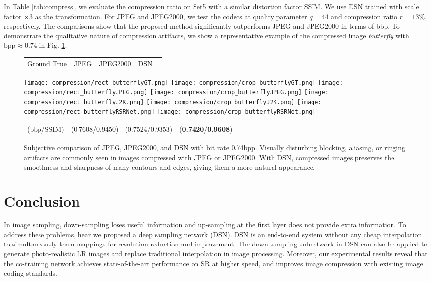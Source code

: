 \documentclass[runningheads]{llncs}
\begin{document}
In Table \ref{tab:compress}, we evaluate the compression ratio on Set5 with a similar distortion factor SSIM. We use DSN trained with scale factor $\times 3$ as the transformation. For JPEG and JPEG2000, we test the codecs at quality parameter $q=44$ and compression ratio $r=13\%$, respectively. The comparisons show that the proposed method significantly outperforms JPEG and JPEG2000 in terms of bbp. To demonstrate the qualitative nature of compression artifacts, we show a representative example of the compressed image \emph{butterfly} with $\text{bpp}\approx 0.74$ in Fig. \ref{fig:compression}.
\begin{figure}[th]
\center
\begin{tabular}{C{2.95cm}C{2.95cm}C{2.95cm}C{2.95cm}c}
Ground True&JPEG&JPEG2000&DSN&
\end{tabular}
\texttt{[image: compression/rect\_butterflyGT.png]}
\texttt{[image: compression/crop\_butterflyGT.png]}
\texttt{[image: compression/rect\_butterflyJPEG.png]}
\texttt{[image: compression/crop\_butterflyJPEG.png]}
\texttt{[image: compression/rect\_butterflyJ2K.png]}
\texttt{[image: compression/crop\_butterflyJ2K.png]}
\texttt{[image: compression/rect\_butterflyRSRNet.png]}
\texttt{[image: compression/crop\_butterflyRSRNet.png]}
\begin{tabular}{C{2.95cm}C{2.95cm}C{2.95cm}C{2.95cm}c}
(bbp/SSIM)&(0.7608/0.9450)&(0.7524/0.9353)&(\textbf{0.7420}/\textbf{0.9608})&
\end{tabular}
\caption{Subjective comparison of JPEG, JPEG2000, and DSN with bit rate 0.74bpp. Visually
disturbing blocking, aliasing, or ringing artifacts are commonly seen in images compressed with JPEG or JPEG2000. With DSN, compressed images preserves the smoothness and sharpness of many contours and edges, giving them a more natural appearance.}
\label{fig:compression}
\end{figure}

\section{Conclusion}
In image sampling, down-sampling loses useful information and up-sampling at the first layer does not provide extra information. To address these problems, hear we proposed a deep sampling network (DSN). DSN is an end-to-end system without any cheap interpolation to simultaneously learn mappings for resolution reduction and improvement. The down-sampling subnetwork in DSN can also be applied to generate photo-realistic LR images and replace traditional interpolation in image processing. Moreover, our experimental results reveal that the co-training network achieves state-of-the-art performance on SR at higher speed, and improves image compression with existing image coding standards.



\end{document}
